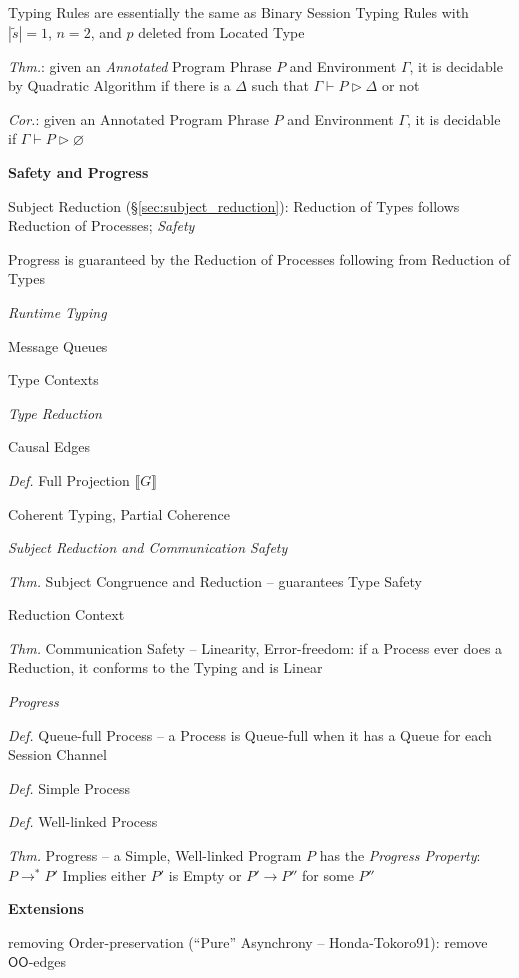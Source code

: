 \fist Typing Rules are essentially the same as Binary Session Typing
Rules with $|\tilde{s}| = 1$, $n = 2$, and $p$ deleted from Located
Type

\emph{Thm.}: given an \emph{Annotated} Program Phrase $P$ and
Environment $\Gamma$, it is decidable by Quadratic Algorithm if there
is a $\Delta$ such that $\Gamma \vdash P \rhd \Delta$ or not

\emph{Cor.}: given an Annotated Program Phrase $P$ and Environment
$\Gamma$, it is decidable if $\Gamma \vdash P \rhd \varnothing$


\textbf{Safety and Progress}

Subject Reduction (\S\ref{sec:subject_reduction}): Reduction of
Types follows Reduction of Processes; \emph{Safety}

Progress is guaranteed by the Reduction of Processes following from
Reduction of Types


\emph{Runtime Typing}

Message Queues

Type Contexts


\emph{Type Reduction}

Causal Edges %

\emph{Def.} Full Projection $\llbracket G \rrbracket$

Coherent Typing, Partial Coherence


\emph{Subject Reduction and Communication Safety}

\emph{Thm.} Subject Congruence and Reduction -- guarantees Type Safety

Reduction Context

\emph{Thm.} Communication Safety -- Linearity, Error-freedom: if a
Process ever does a Reduction, it conforms to the Typing and is Linear


\emph{Progress}

\emph{Def.} Queue-full Process -- a Process is Queue-full when it has
a Queue for each Session Channel

\emph{Def.} Simple Process

\emph{Def.} Well-linked Process

\emph{Thm.} Progress -- a Simple, Well-linked Program $P$ has the
\emph{Progress Property}: $P \rightarrow^* P'$ Implies either $P'$ is
Empty or $P' \rightarrow P''$ for some $P''$


\textbf{Extensions}

removing Order-preservation (``Pure'' Asynchrony -- Honda-Tokoro91):
remove $\mathsf{OO}$-edges %

